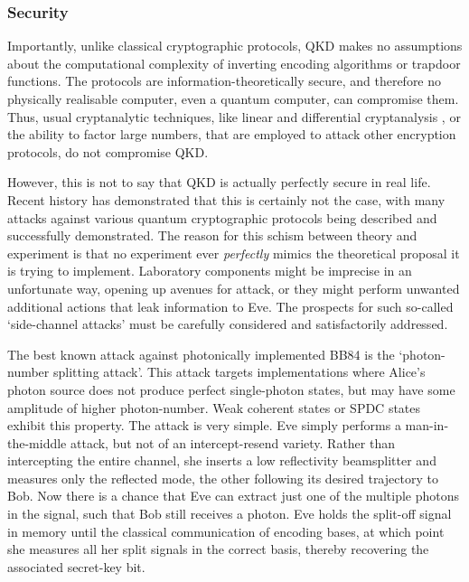%
%

\subsubsection{Security}

Importantly, unlike classical cryptographic protocols, QKD makes no assumptions about the computational complexity of inverting encoding algorithms or trapdoor functions. The protocols are information-theoretically secure, and therefore no physically realisable computer, even a quantum computer, can compromise them. Thus, usual cryptanalytic techniques, like linear and differential cryptanalysis \cite{bib:Schneier96}, or the ability to factor large numbers, that are employed to attack other encryption protocols, do not compromise QKD.

However, this is not to say that QKD is actually perfectly secure in real life. Recent history has demonstrated that this is certainly not the case, with many attacks against various quantum cryptographic protocols being described and successfully demonstrated. The reason for this schism between theory and experiment is that no experiment ever \textit{perfectly} mimics the theoretical proposal it is trying to implement. Laboratory components might be imprecise in an unfortunate way, opening up avenues for attack, or they might perform unwanted additional actions that leak information to Eve. The prospects for such so-called `side-channel attacks' must be carefully considered and satisfactorily addressed.

The best known attack against photonically implemented BB84 is the `photon-number splitting attack'. This attack targets implementations where Alice's photon source does not produce perfect single-photon states, but may have some amplitude of higher photon-number. Weak coherent states or SPDC states exhibit this property. The attack is very simple. Eve simply performs a man-in-the-middle attack, but not of an intercept-resend variety. Rather than intercepting the entire channel, she inserts a low reflectivity beamsplitter and measures only the reflected mode, the other following its desired trajectory to Bob. Now there is a chance that Eve can extract just one of the multiple photons in the signal, such that Bob still receives a photon. Eve holds the split-off signal in memory until the classical communication of encoding bases, at which point she measures all her split signals in the correct basis, thereby recovering the associated secret-key bit.

